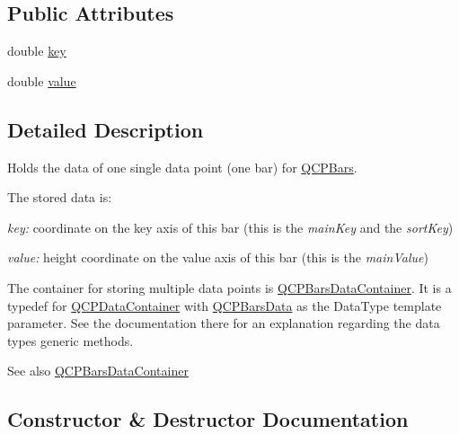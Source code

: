 \subsection*{Public Attributes}
\begin{DoxyCompactItemize}
\item 
double \hyperlink{class_q_c_p_bars_data_a09b492217dc03ee1c0348a2f2e6e0a04}{key}
\item 
double \hyperlink{class_q_c_p_bars_data_ab636644fb40630f3b1b72f44d65ec072}{value}
\end{DoxyCompactItemize}


\subsection{Detailed Description}
Holds the data of one single data point (one bar) for \hyperlink{class_q_c_p_bars}{Q\+C\+P\+Bars}. 

The stored data is\+: \begin{DoxyItemize}
\item {\itshape key\+:} coordinate on the key axis of this bar (this is the {\itshape main\+Key} and the {\itshape sort\+Key}) \item {\itshape value\+:} height coordinate on the value axis of this bar (this is the {\itshape main\+Value})\end{DoxyItemize}
The container for storing multiple data points is \hyperlink{qcustomplot_8h_a52bf589c9fce1baa36c1d40d69785d46}{Q\+C\+P\+Bars\+Data\+Container}. It is a typedef for \hyperlink{class_q_c_p_data_container}{Q\+C\+P\+Data\+Container} with \hyperlink{class_q_c_p_bars_data}{Q\+C\+P\+Bars\+Data} as the Data\+Type template parameter. See the documentation there for an explanation regarding the data type\textquotesingle{}s generic methods.

\begin{DoxySeeAlso}{See also}
\hyperlink{qcustomplot_8h_a52bf589c9fce1baa36c1d40d69785d46}{Q\+C\+P\+Bars\+Data\+Container} 
\end{DoxySeeAlso}


\subsection{Constructor \& Destructor Documentation}
\mbox{\label{class_q_c_p_bars_data_a800794d4c5fea22eeb8bade20798496b}} 
